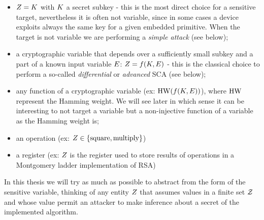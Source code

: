\begin{itemize}
\item $Z = K$ with $K$ a secret subkey - this is the most direct choice for a sensitive target, nevertheless it is often not variable, since in some cases a device exploits always the same key for a given embedded primitive. When the target is not variable we are performing a \emph{simple attack} (see below);
\item a cryptographic variable that depends over a sufficiently small subkey and a part of a known input variable $E$: $Z = f(K,E)$ - this is the classical choice to perform a so-called \emph{differential} or \emph{advanced} SCA (see below);
\item any function of a cryptographic variable (ex: $\mathrm{HW}(f(K,E))$), where $\mathrm{HW}$ represent the Hamming weight. We will see later in which sense it can be interesting to not target a variable but a non-injective function of a variable as the Hamming weight is;
\item an operation (ex: $Z \in \{\mathrm{square}, \mathrm{multiply}\}$)
\item a register (ex: $Z$ is the register used to store results of operations in a Montgomery ladder implementation of RSA)
\end{itemize}
In this thesis we will try as much as possible to abstract from the form of the sensitive variable, thinking of any entity $Z$ that assumes values in a finite set $\mathcal{Z}$ and whose value permit an attacker to make inference about a secret of the implemented algorithm.

